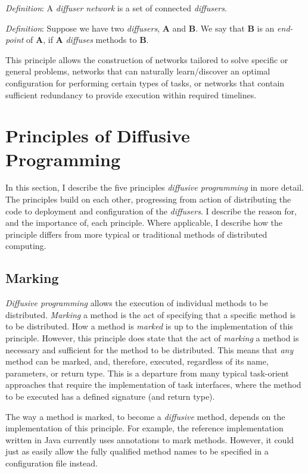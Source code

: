 \documentclass[11pt]{amsart}
\begin{document}
\begin{description}
	\emph{Definition}: A \emph{diffuser network} is a set of connected \emph{diffusers}.
	
	\emph{Definition}: Suppose we have two \emph{diffusers}, \textbf{A} and \textbf{B}. We say that \textbf{B} is an \emph{end-point} of \textbf{A}, if \textbf{A} \emph{diffuses} methods to \textbf{B}.
	
	This principle allows the construction of networks tailored to solve specific or general problems, networks that can naturally learn/discover an optimal configuration for performing certain types of tasks, or networks that contain sufficient redundancy to provide execution within required timelines.

\end{description}

%
%
\section{Principles of Diffusive Programming}
In this section, I describe the five principles \emph{diffusive programming} in more detail. The principles build on each other, progressing from action of distributing the code to deployment and configuration of the \emph{diffusers}. I describe the reason for, and the importance of, each principle. Where applicable, I describe how the principle differs from more typical or traditional methods of distributed computing.

\subsection{Marking}
\emph{Diffusive programming} allows the execution of individual methods to be distributed. \emph{Marking} a method is the act of specifying that a specific method is to be distributed. How a method is \emph{marked} is up to the implementation of this principle. However, this principle does state that the act of \emph{marking} a method is necessary and sufficient for the method to be distributed. This means that \emph{any} method can be marked, and, therefore, executed, regardless of its name, parameters, or return type. This is a departure from many typical task-orient approaches that require the implementation of task interfaces, where the method to be executed has a defined signature (and return type).

The way a method is marked, to become a \emph{diffusive} method, depends on the implementation of this principle. For example, the reference implementation written in Java currently uses annotations to mark methods. However, it could just as easily allow the fully qualified method names to be specified in a configuration file instead.
\end{document}
